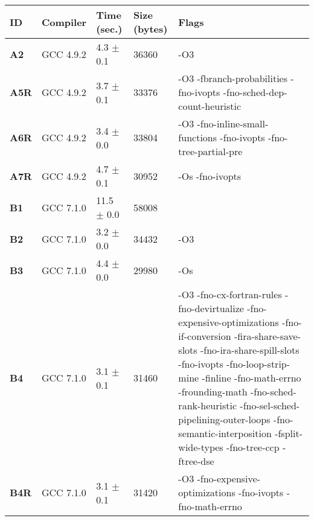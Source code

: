     \begin{tabular}{|l|l|l|l|p{3.2in}|}
     \hline
      \textbf{ID} & \textbf{Compiler} & \textbf{Time (sec.)} & \textbf{Size (bytes)} & \textbf{Flags} \\ 
     \hline
      \textbf{ A2 } &  GCC 4.9.2  &  4.3 $\pm$ 0.1  &  36360  & {\small -O3 }\\
     \hline
      \textbf{ A5R } &  GCC 4.9.2  &  3.7 $\pm$ 0.1  &  33376  & {\small -O3 -fbranch-probabilities -fno-ivopts -fno-sched-dep-count-heuristic }\\
     \hline
      \textbf{ A6R } &  GCC 4.9.2  &  3.4 $\pm$ 0.0  &  33804  & {\small -O3 -fno-inline-small-functions -fno-ivopts -fno-tree-partial-pre }\\
     \hline
      \textbf{ A7R } &  GCC 4.9.2  &  4.7 $\pm$ 0.1  &  30952  & {\small -Os -fno-ivopts }\\
     \hline
      \textbf{ B1 } &  GCC 7.1.0  &  11.5 $\pm$ 0.0  &  58008  & {\small  }\\
     \hline
      \textbf{ B2 } &  GCC 7.1.0  &  3.2 $\pm$ 0.0  &  34432  & {\small -O3 }\\
     \hline
      \textbf{ B3 } &  GCC 7.1.0  &  4.4 $\pm$ 0.0  &  29980  & {\small -Os }\\
     \hline
      \textbf{ B4 } &  GCC 7.1.0  &  3.1 $\pm$ 0.1  &  31460  & {\small -O3 -fno-cx-fortran-rules -fno-devirtualize -fno-expensive-optimizations -fno-if-conversion -fira-share-save-slots -fno-ira-share-spill-slots -fno-ivopts -fno-loop-strip-mine -finline -fno-math-errno -frounding-math -fno-sched-rank-heuristic -fno-sel-sched-pipelining-outer-loops -fno-semantic-interposition -fsplit-wide-types -fno-tree-ccp -ftree-dse }\\
     \hline
      \textbf{ B4R } &  GCC 7.1.0  &  3.1 $\pm$ 0.1  &  31420  & {\small -O3 -fno-expensive-optimizations -fno-ivopts -fno-math-errno }\\
     \hline
    \end{tabular}    